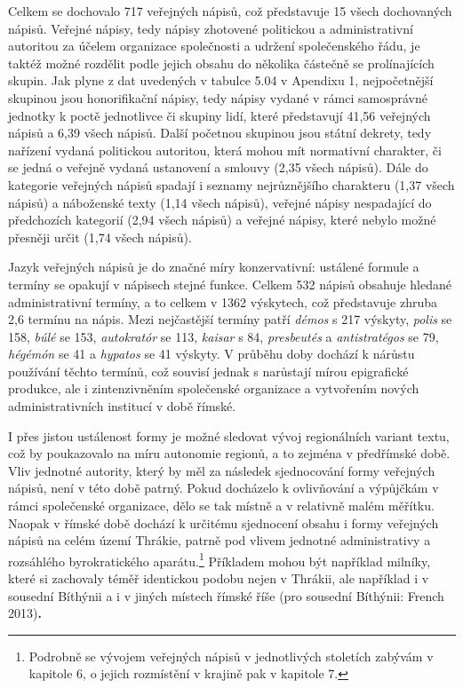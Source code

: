 Celkem se dochovalo 717 veřejných nápisů, což představuje 15  všech dochovaných nápisů. Veřejné nápisy, tedy nápisy zhotovené politickou a administrativní autoritou za účelem organizace společnosti a udržení společenského řádu, je taktéž možné rozdělit podle jejich obsahu do několika částečně se prolínajících skupin. Jak plyne z dat uvedených v tabulce 5.04 v Apendixu 1, nejpočetnější skupinou jsou honorifikační nápisy, tedy nápisy vydané v rámci samosprávné jednotky k poctě jednotlivce či skupiny lidí, které představují 41,56  veřejných nápisů a 6,39  všech nápisů. Další početnou skupinou jsou státní dekrety, tedy nařízení vydaná politickou autoritou, která mohou mít normativní charakter, či se jedná o veřejně vydaná ustanovení a smlouvy (2,35  všech nápisů). Dále do kategorie veřejných nápisů spadají i seznamy nejrůznějšího charakteru (1,37  všech nápisů) a náboženské texty (1,14  všech nápisů), veřejné nápisy nespadající do předchozích kategorií (2,94  všech nápisů) a veřejné nápisy, které nebylo možné přesněji určit (1,74  všech nápisů).

Jazyk veřejných nápisů je do značné míry konzervativní: ustálené formule a termíny se opakují v nápisech stejné funkce. Celkem 532 nápisů obsahuje hledané administrativní termíny, a to celkem v 1362 výskytech, což představuje zhruba 2,6 termínu na nápis. Mezi nejčastější termíny patří {\em démos} s 217 výskyty, {\em polis} se 158, {\em búlé} se 153, {\em autokratór} se 113, {\em kaisar} s 84, {\em presbeutés} a {\em antistratégos} se 79, {\em hégémón} se 41 a {\em hypatos} se 41 výskyty. V průběhu doby dochází k nárůstu používání těchto termínů, což souvisí jednak s narůstají mírou epigrafické produkce, ale i zintenzivněním společenské organizace a vytvořením nových administrativních institucí v době římské.

I přes jistou ustálenost formy je možné sledovat vývoj regionálních variant textu, což by poukazovalo na míru autonomie regionů, a to zejména v předřímské době. Vliv jednotné autority, který by měl za následek sjednocování formy veřejných nápisů, není v této době patrný. Pokud docházelo k ovlivňování a výpůjčkám v rámci společenské organizace, dělo se tak místně a v relativně malém měřítku. Naopak v římské době dochází k určitému sjednocení obsahu i formy veřejných nápisů na celém území Thrákie, patrně pod vlivem jednotné administrativy a rozsáhlého byrokratického aparátu.\footnote{Podrobně se vývojem veřejných nápisů v jednotlivých stoletích zabývám v kapitole 6, o jejich rozmístění v krajině pak v kapitole 7.} Příkladem mohou být například milníky, které si zachovaly téměř identickou podobu nejen v Thrákii, ale například i v sousední Bíthýnii a i v jiných místech římské říše (pro sousední Bíthýnii: French 2013){\bf .}

